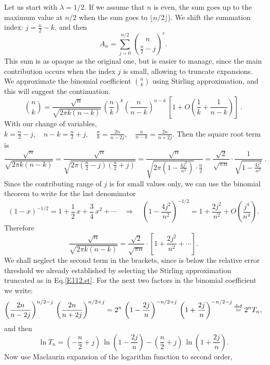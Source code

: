 \documentclass[11pt]{article}
\newcommand{\DS}{\displaystyle}
\newcommand{\lar}{\Longrightarrow}
\newcommand{\eqdef}{\stackrel{\rm def}{=}}
\newcommand{\lp}{\left(}
\newcommand{\rp}{\right)}
\begin{document}
Let us start with $\lambda = 1/2$. If we assume that $n$ is even, the
sum goes up to the maximum value at $n/2$
when the sum goes to $\lfloor n/2 \rfloor$).
We shift the summation index: $j= \frac{n}{2} -k$, and then 
\begin{equation}\label{E112.26}
A_n = \sum_{j=0}^{n/2} \,\binom{n}{\frac{n}{2} -j}^r.
\end{equation}
This sum is as opaque as the original one, but is easier to manage, since
the main contribution occurs when the index $j$ is small, allowing to
truncate expansions.
We approximate the binomial coefficient $\binom{n}{k}$ using Stirling
approximation, and this will suggest the continuation.
\begin{equation}\label{E112.st}
\binom{n}{k} = \frac{\sqrt{n}}{\sqrt{2\pi k(n-k)}} \,\lp \frac{n}{k}
\rp^k \lp \frac{n}{n-k} \rp^{n-k} \,\left[ 1+ O\lp \frac{1}{k}
+ \frac{1}{n-k} \rp \right] \ .
\end{equation}
With our change of variables,
$\DS
k=\frac{n}{2} -j , \quad n-k = \frac{n}{2} +j ,\quad \frac{n}{k} =
\frac{2n}{n-2j} , \quad \frac{n}{n-k} = \frac{2n}{n+2j} .
$
Then the square root term is
\[
\frac{\sqrt{n}}{\sqrt{2\pi k(n-k)}} = \frac{\sqrt{n}}{\sqrt{2\pi \lp 
\frac{n}{2} -j \rp \lp \frac{n}{2} +j \rp  }} =
\frac{\sqrt{n}}{\sqrt{2\pi \lp 1-\frac{4 j^2}{n^2} \rp} \cdot
\frac{n}{2}} = \frac{\sqrt{2}}{\sqrt{\pi n}} \cdot
\frac{1}{\sqrt{1- \frac{4 j^2}{n^2}}} \ .
\]
Since the contributing range of $j$ is for small values only, we can use
the binomial theorem to write for the last denominator
\[
(1-x)^{-1/2} = 1 +\frac{1}{2} \, x + \frac{3}{4} \, x^2 + \cdots
\quad\lar\quad \lp 1-\frac{4 j^2}{n^2} \rp^{-1/2}
= 1 + \frac{2j^2}{n^2} + O\lp\frac{j^4}{n^4}\rp.
\]
Therefore
\[
\frac{\sqrt{n}}{\sqrt{2\pi k(n-k)}} = \frac{\sqrt{2}}{\sqrt{\pi n}} \cdot
\left[ 1+\frac{2j^2}{n^2} + \cdots \right] . 
\]
We shall neglect the second term in the brackets, since is below the
relative error threshold we already established by selecting the Stirling
approximation truncated as in Eq.\;\eqref{E112.st}.
For the next two factors in the binomial coefficient we write:
\[
\lp \frac{2n}{n-2j} \rp^{n/2 -j}\, \lp \frac{2n}{n+2j} \rp^{n/2 +j} = 
2^n \,\lp 1 - \frac{2j}{n} \rp^{-n/2 +j}
\,\lp 1 + \frac{2j}{n} \rp^{-n/2 -j} \eqdef 2^nT_n, 
\]
and then
\begin{equation}\label{E111.27}
\ln T_n = \lp -\frac{n}{2} +j \rp \,\ln \lp 1 - \frac{2j}{n} \rp
- \lp\frac{n}{2} +j \rp \,\ln \lp 1 + \frac{2j}{n} \rp .
\end{equation}
Now use Maclaurin expansion of the logarithm function to second order,
\end{document}
